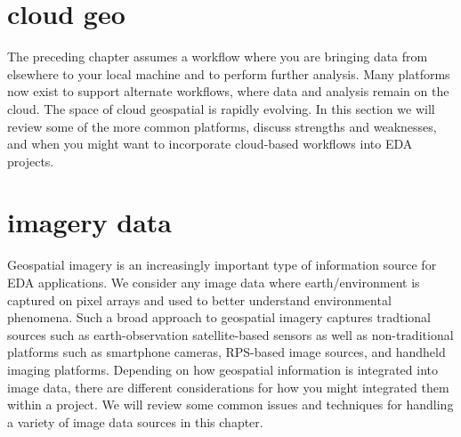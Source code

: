 \documentclass[
]{book}
\begin{document}
\hypertarget{cloud-geo}{%
\chapter{cloud geo}\label{cloud-geo}}

The preceding chapter assumes a workflow where you are bringing data from elsewhere to your local machine and to perform further analysis. Many platforms now exist to support alternate workflows, where data and analysis remain on the cloud. The space of cloud geospatial is rapidly evolving. In this section we will review some of the more common platforms, discuss strengths and weaknesses, and when you might want to incorporate cloud-based workflows into EDA projects.

\hypertarget{imagery-data}{%
\chapter{imagery data}\label{imagery-data}}

Geospatial imagery is an increasingly important type of information source for EDA applications. We consider any image data where earth/environment is captured on pixel arrays and used to better understand environmental phenomena. Such a broad approach to geospatial imagery captures tradtional sources such as earth-observation satellite-based sensors as well as non-traditional platforms such as smartphone cameras, RPS-based image sources, and handheld imaging platforms. Depending on how geospatial information is integrated into image data, there are different considerations for how you might integrated them within a project. We will review some common issues and techniques for handling a variety of image data sources in this chapter.

  
\end{document}
